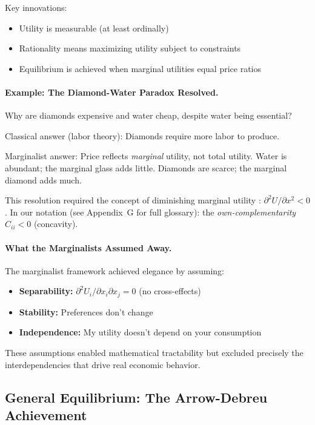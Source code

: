 \documentclass[12pt,a4paper]{article}
\begin{document}
Key innovations:
\begin{itemize}
  \item Utility is measurable (at least ordinally)
  \item Rationality means maximizing utility subject to constraints
  \item Equilibrium is achieved when marginal utilities equal price ratios
\end{itemize}

\paragraph{Example: The Diamond-Water Paradox Resolved.}
Why are diamonds expensive and water cheap, despite water being essential?

Classical answer (labor theory): Diamonds require more labor to produce.

Marginalist answer: Price reflects \emph{marginal} utility, not total utility.
Water is abundant; the marginal glass adds little. Diamonds are scarce; the marginal diamond adds much.

This resolution required the concept of diminishing marginal utility \citep{marshall1890}:
$\partial^2 U / \partial x^2 < 0$.
In our notation (see Appendix~G for full glossary): the \emph{own-complementarity} $C_{ii} < 0$ (concavity).

\paragraph{What the Marginalists Assumed Away.}
The marginalist framework achieved elegance by assuming:
\begin{itemize}
  \item \textbf{Separability:} $\partial^2 U_i / \partial x_i \partial x_j = 0$ (no cross-effects)
  \item \textbf{Stability:} Preferences don't change
  \item \textbf{Independence:} My utility doesn't depend on your consumption
\end{itemize}

These assumptions enabled mathematical tractability but excluded precisely
the interdependencies that drive real economic behavior.

\subsection{General Equilibrium: The Arrow-Debreu Achievement}
\end{document}
